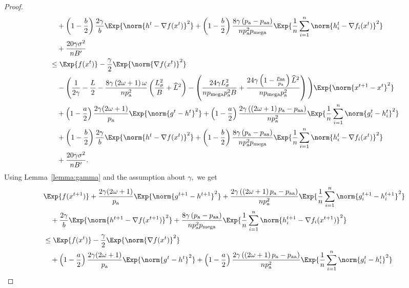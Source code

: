 \documentclass{article}
\newcommand*{\probavailable}{\ensuremath{p_{\textnormal{a}}}}
\newcommand*{\probpairaa}{\ensuremath{p_{\textnormal{aa}}}}
\newcommand*{\probmega}{\ensuremath{p_{\text{mega}}}}
\begin{document}
\begin{proof}
\begin{align*}
    &\quad + \left(1 - \frac{b}{2}\right)\frac{2\gamma}{b} \Exp{\norm{h^{t} - \nabla f(x^{t})}^2} + \left(1 - \frac{b}{2}\right)\frac{8 \gamma \left(\probavailable - \probpairaa\right)}{n \probavailable^2 \probmega}\Exp{\frac{1}{n}\sum_{i=1}^n\norm{h^{t}_i - \nabla f_i(x^{t})}^2} \\
    &\quad + \frac{20 \gamma \sigma^2}{n B'} \\
    &\leq \Exp{f(x^t)} - \frac{\gamma}{2}\Exp{\norm{\nabla f(x^t)}^2} \\
    &\quad - \Bigg(\frac{1}{2\gamma} - \frac{L}{2} - \frac{8 \gamma \left(2 \omega + 1\right)\omega}{n \probavailable^2}\left(\frac{L_{\sigma}^2}{B} + \widehat{L}^2\right) - \left(\frac{24 \gamma L_{\sigma}^2}{n \probmega \probavailable^2 B} + \frac{24 \gamma \left(1 - \frac{\probpairaa}{\probavailable}\right) \widehat{L}^2}{n \probmega \probavailable^2}\right)\Bigg) \Exp{\norm{x^{t+1} - x^t}^2} \\
    &\quad + \left(1 - \frac{a}{2}\right)\frac{2\gamma(2\omega + 1)}{\probavailable} \Exp{\norm{g^{t} - h^{t}}^2} + \left(1 - \frac{a}{2}\right)\frac{2\gamma\left(\left(2 \omega + 1\right)\probavailable - \probpairaa\right)}{n \probavailable^2}\Exp{\frac{1}{n}\sum_{i=1}^n\norm{g^{t}_i - h^{t}_i}^2} \\
    &\quad + \left(1 - \frac{b}{2}\right)\frac{2\gamma}{b} \Exp{\norm{h^{t} - \nabla f(x^{t})}^2} + \left(1 - \frac{b}{2}\right)\frac{8 \gamma \left(\probavailable - \probpairaa\right)}{n \probavailable^2 \probmega}\Exp{\frac{1}{n}\sum_{i=1}^n\norm{h^{t}_i - \nabla f_i(x^{t})}^2} \\
    &\quad + \frac{20 \gamma \sigma^2}{n B'}.
  \end{align*}
  Using Lemma~\ref{lemma:gamma} and the assumption about $\gamma,$ we get
  \begin{align*}
    &\Exp{f(x^{t + 1})} + \frac{2\gamma(2\omega + 1)}{\probavailable} \Exp{\norm{g^{t+1} - h^{t+1}}^2} + \frac{2\gamma\left(\left(2 \omega + 1\right)\probavailable - \probpairaa\right)}{n \probavailable^2} \Exp{\frac{1}{n}\sum_{i=1}^n\norm{g^{t+1}_i - h^{t+1}_i}^2}\\
    &\quad  + \frac{2\gamma}{b} \Exp{\norm{h^{t+1} - \nabla f(x^{t+1})}^2} + \frac{8 \gamma \left(\probavailable - \probpairaa\right)}{n \probavailable^2 \probmega} \Exp{\frac{1}{n}\sum_{i=1}^n\norm{h^{t+1}_i - \nabla f_i(x^{t+1})}^2}\\
    &\leq \Exp{f(x^t)} - \frac{\gamma}{2}\Exp{\norm{\nabla f(x^t)}^2} \\
    &\quad + \left(1 - \frac{a}{2}\right)\frac{2\gamma(2\omega + 1)}{\probavailable} \Exp{\norm{g^{t} - h^{t}}^2} + \left(1 - \frac{a}{2}\right)\frac{2\gamma\left(\left(2 \omega + 1\right)\probavailable - \probpairaa\right)}{n \probavailable^2}\Exp{\frac{1}{n}\sum_{i=1}^n\norm{g^{t}_i - h^{t}_i}^2} \\

\end{align*}
\end{proof}
\end{document}
